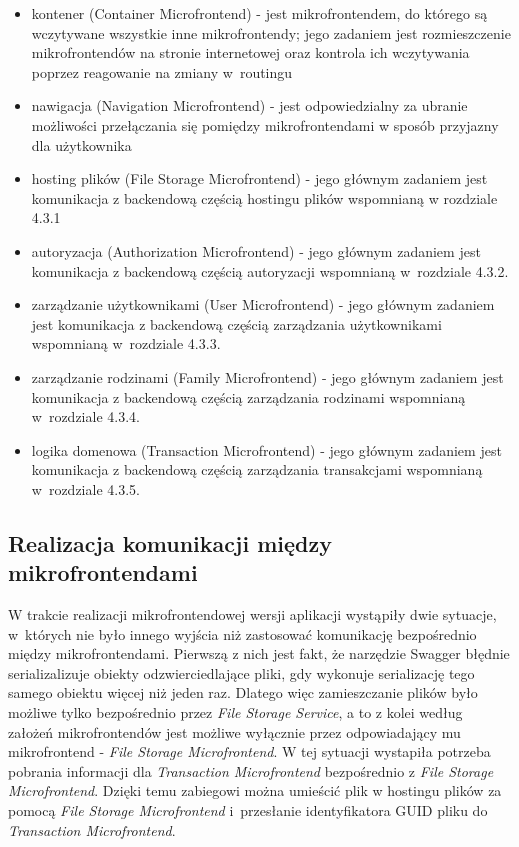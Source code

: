 \documentclass{SGGW-thesis}
\begin{document}
  \begin{itemize}
    \item kontener (Container Microfrontend) - jest mikrofrontendem, do którego są wczytywane wszystkie inne mikrofrontendy; jego zadaniem jest rozmieszczenie mikrofrontendów na stronie internetowej oraz kontrola ich wczytywania poprzez reagowanie na zmiany w~routingu
    \item nawigacja (Navigation Microfrontend) - jest odpowiedzialny za ubranie możliwości przełączania się pomiędzy mikrofrontendami w sposób przyjazny dla użytkownika
    \item hosting plików (File Storage Microfrontend) - jego głównym zadaniem jest komunikacja z backendową częścią hostingu plików wspomnianą w rozdziale 4.3.1
    \item autoryzacja (Authorization Microfrontend) - jego głównym zadaniem jest komunikacja z backendową częścią autoryzacji wspomnianą w~rozdziale 4.3.2.
    \item zarządzanie użytkownikami (User Microfrontend) - jego głównym zadaniem jest komunikacja z backendową częścią zarządzania użytkownikami wspomnianą w~rozdziale 4.3.3.
    \item zarządzanie rodzinami (Family Microfrontend) - jego głównym zadaniem jest komunikacja z backendową częścią zarządzania rodzinami wspomnianą w~rozdziale 4.3.4.
    \item logika domenowa (Transaction Microfrontend) - jego głównym zadaniem jest komunikacja z backendową częścią zarządzania transakcjami wspomnianą w~rozdziale 4.3.5.
  \end{itemize}

  \subsection{Realizacja komunikacji między mikrofrontendami}
  W trakcie realizacji mikrofrontendowej wersji aplikacji wystąpiły dwie sytuacje, w~których nie było innego wyjścia niż zastosować komunikację bezpośrednio między mikrofrontendami.
  Pierwszą z nich jest fakt, że narzędzie Swagger błędnie serializalizuje obiekty odzwierciedlające pliki, gdy wykonuje serializację tego samego obiektu więcej niż jeden raz. Dlatego więc zamieszczanie plików było możliwe tylko bezpośrednio przez \textit{File Storage Service}, a to z kolei według założeń mikrofrontendów jest możliwe wyłącznie przez odpowiadający mu mikrofrontend - \textit{File Storage Microfrontend}. W tej sytuacji wystapiła potrzeba pobrania informacji dla \textit{Transaction Microfrontend} bezpośrednio z \textit{File Storage Microfrontend}. Dzięki temu zabiegowi można umieścić plik w hostingu plików za pomocą \textit{File Storage Microfrontend} i~przesłanie identyfikatora GUID pliku do \textit{Transaction Microfrontend}.
\end{document}
